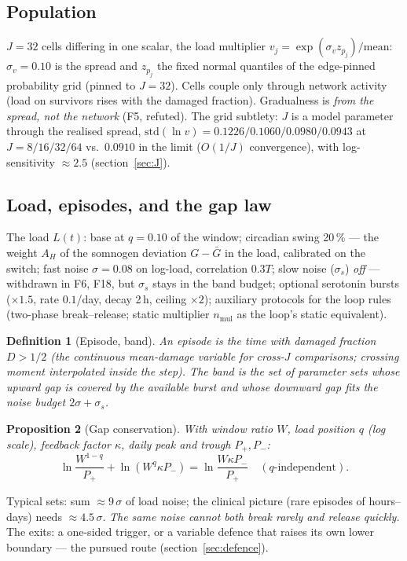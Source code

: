\documentclass[11pt,a4paper]{article}
\newtheorem{proposition}{Proposition}[section]
\newtheorem{definition}[proposition]{Definition}
\theoremstyle{remark}
\begin{document}
\subsection{Population}\label{sec:pop}
$J=32$ cells differing in one scalar, the load multiplier
$v_j=\exp(\sigma_v z_{p_j})/\mathrm{mean}$: $\sigma_v=0.10$ is the spread and $z_{p_j}$
the fixed normal quantiles of the edge-pinned probability grid (pinned to $J=32$).
Cells couple only through network activity (load on survivors
rises with the damaged fraction). Gradualness is \emph{from the spread, not the
network} (F5, refuted). The grid subtlety: $J$ is a model parameter through the
realised spread, $\mathrm{std}(\ln v)=0.1226/0.1060/0.0980/0.0943$ at
$J=8/16/32/64$ vs.\ $0.0910$ in the limit ($O(1/J)$ convergence), with log-sensitivity
$\approx2.5$ (section~\ref{sec:J}).

\subsection{Load, episodes, and the gap law}\label{sec:gap}
The load $L(t)$: base at $q=0.10$ of the window; circadian swing 20\,\% --- the weight
$A_H$ of the somnogen deviation $G-\bar G$ in the load, calibrated on the switch;
fast noise $\sigma=0.08$ on log-load, correlation $0.3T$;
slow noise ($\sigma_s$) \emph{off} --- withdrawn in F6, F18, but $\sigma_s$ stays in
the band budget; optional serotonin bursts
($\times1.5$, rate $0.1$/day, decay 2\,h, ceiling $\times2$); auxiliary protocols for
the loop rules (two-phase break--release; static multiplier $n_{\mathrm{mul}}$ as the
loop's static equivalent).

\begin{definition}[Episode, band]
An episode is the time with damaged fraction $D>1/2$ (the continuous mean-damage
variable for cross-$J$ comparisons; crossing moment interpolated inside the step). The
\emph{band} is the set of parameter sets whose upward gap is covered by the available
burst and whose downward gap fits the noise budget $2\sigma+\sigma_s$.
\end{definition}

\begin{proposition}[Gap conservation]\label{prop:gap}
With window ratio $W$, load position $q$ (log scale), feedback factor $\kappa$, daily
peak and trough $P_+,P_-$:
\begin{equation}\label{eq:gap}
\ln\frac{W^{1-q}}{P_+}+\ln(W^q\kappa P_-)=\ln\frac{W\kappa P_-}{P_+}\quad(q\text{-independent}).
\end{equation}
\end{proposition}
Typical sets: sum $\approx9\,\sigma$ of load noise; the clinical picture (rare episodes
of hours--days) needs $\approx4.5\,\sigma$. \emph{The same noise cannot both break
rarely and release quickly.} The exits: a one-sided trigger, or a variable defence that
raises its own lower boundary --- the pursued route (section~\ref{sec:defence}).
\end{document}
